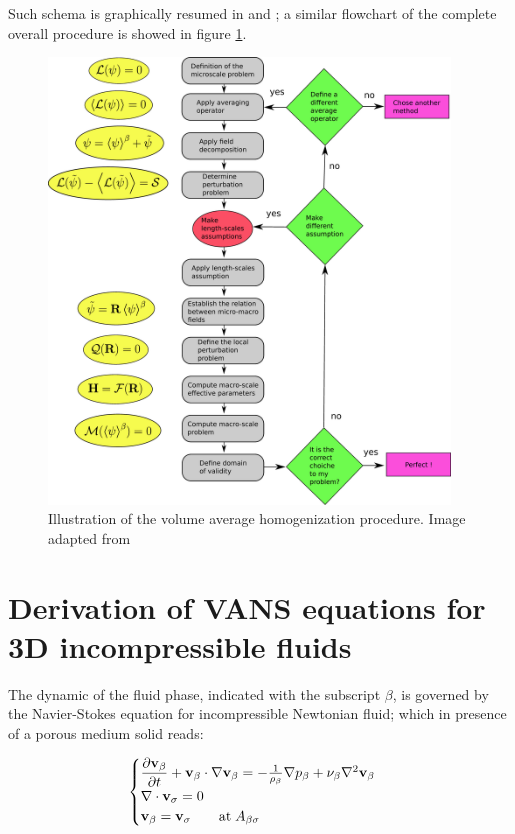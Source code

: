 Such schema is graphically resumed in \citet{paez2017macroscopic} and \citet{davit2013homogenization}; a similar flowchart of the complete overall procedure is showed in figure \ref{fig:schema_vans_homo}.

\begin{figure}[h!]
	\centering
	\includegraphics[width=0.95\textwidth,height=0.95\textheight,keepaspectratio]{chapter_2/figure/schema}
	\caption{Illustration of the volume average homogenization procedure. Image adapted from \citet{davit2013homogenization}}
	\label{fig:schema_vans_homo}
\end{figure}

\section{Derivation of VANS equations for 3D incompressible fluids}
The dynamic of the fluid phase, indicated with the subscript $\beta$, is governed by the Navier-Stokes equation for incompressible Newtonian fluid; which in presence of a porous medium solid reads:

\begin{eqnarray}
	\begin{cases}
		\dfrac{\partial \textbf{v}_{\beta}}{\partial t} + \textbf{v}_{\beta} \cdot \nabla \textbf{v}_{\beta} = -\frac{1}{\rho_{\beta}} \nabla p_{\beta} + \nu_{\beta} \nabla^2  \textbf{v}_{\beta}  \\
		\nabla \cdot \textbf{v}_{\sigma} = 0 \\
		\textbf{v}_{\beta} = \textbf{v}_{\sigma} \qquad \text{at} \; A_{\beta\sigma}
	\end{cases}
\label{eq:NS}
\end{eqnarray}\\

